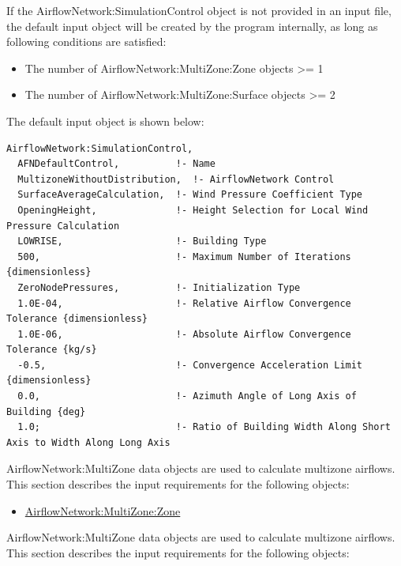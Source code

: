 If the AirflowNetwork:SimulationControl object is not provided in an input file, the default input object will be created by the program internally, as long as following conditions are satisfied:
\begin{itemize}
\item The number of AirflowNetwork:MultiZone:Zone objects >= 1
\item The number of AirflowNetwork:MultiZone:Surface objects >= 2
\end{itemize}
The default input object is shown below:

\begin{lstlisting}
AirflowNetwork:SimulationControl,
  AFNDefaultControl,          !- Name
  MultizoneWithoutDistribution,  !- AirflowNetwork Control
  SurfaceAverageCalculation,  !- Wind Pressure Coefficient Type
  OpeningHeight,              !- Height Selection for Local Wind Pressure Calculation
  LOWRISE,                    !- Building Type
  500,                        !- Maximum Number of Iterations {dimensionless}
  ZeroNodePressures,          !- Initialization Type
  1.0E-04,                    !- Relative Airflow Convergence Tolerance {dimensionless}
  1.0E-06,                    !- Absolute Airflow Convergence Tolerance {kg/s}
  -0.5,                       !- Convergence Acceleration Limit {dimensionless}
  0.0,                        !- Azimuth Angle of Long Axis of Building {deg}
  1.0;                        !- Ratio of Building Width Along Short Axis to Width Along Long Axis
\end{lstlisting}

AirflowNetwork:MultiZone data objects are used to calculate multizone airflows. This section describes the input requirements for the following objects:

\begin{itemize}
\tightlist
\item
  \hyperref[airflownetworkmultizonezone]{AirflowNetwork:MultiZone:Zone}
\end{itemize}

AirflowNetwork:MultiZone data objects are used to calculate multizone airflows. This section describes the input requirements for the following objects:

